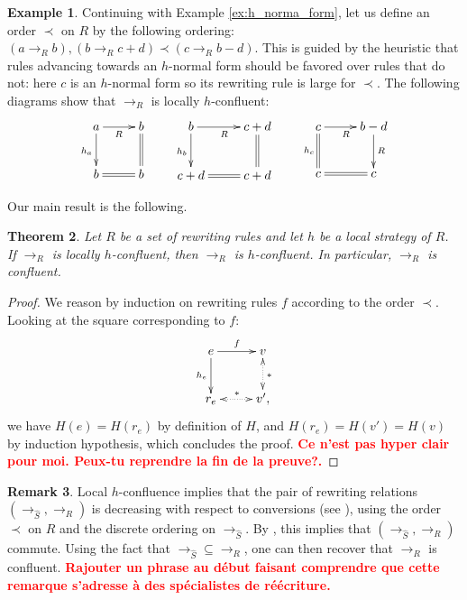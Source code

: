 \documentclass[10pt]{easychair}
\newtheorem{theorem}{Theorem}[section]
\theoremstyle{definition}
\newtheorem{remark}[theorem]{Remark}
\newtheorem{example}[theorem]{Example}
\newcommand\todo[1]{{\bf\textcolor{red}{#1.}}}
\newcommand\rewR{\to_R}
\newcommand\rewS{\to_{\hat{S}}}
\begin{document}
\begin{example}
  Continuing with Example \ref{ex:h_norma_form}, let us define an order
  $\prec$ on $R$ by the following ordering: $(a\rewR b), (b\rewR c+d)
  \prec (c\rewR b-d)$. This is guided by the heuristic that rules
  advancing towards an $h$-normal form should be favored over rules that
  do not: here $c$ is an $h$-normal form so its rewriting rule is large
  for $\prec$. The following diagrams show that $\rewR$ is locally
  $h$-confluent:
  \[
  \xymatrix @C = 2.5em @R = 2.5em{
    a \ar [r] _{R}  
    \ar [d] _{h_a}   
    & b 
    \ar@{=} [d]
    \\
    b
    \ar@{=} [r]
    & b
  }
  \qquad
  \xymatrix @C = 2.5em @R = 2.5em{
    b \ar [r] _{R}  
    \ar [d] _{h_b}   
    & c+d
    \ar@{=} [d]
    \\
    c+d
    \ar@{=} [r]
    & c+d
  }
  \qquad
  \xymatrix @C = 2.5em @R = 2.5em{
    c \ar [r] _{R}  
    \ar@{=} [d] _{h_c}   
    & b-d
    \ar [d] ^{R}
    \\
    c
    \ar@{=} [r]
    & c
  }
  \]
\end{example}
\medskip

Our main result is the following.
\smallskip

\begin{theorem}\label{thm:confluence_criterion}
  Let $R$ be a set of rewriting rules and let $h$ be a local strategy of
  $R$. If $\rewR$ is locally $h$-confluent, then $\rewR$ is
  $h$-confluent. In particular, $\rewR$ is confluent. 
\end{theorem}
\smallskip

\begin{proof}
  We reason by induction on rewriting rules $f$ according to the order
  $\prec$. Looking at the square corresponding to $f$:
  \[
  \xymatrix @C = 2.5em @R = 2.5em{
    e 
    \ar [r] ^{f}
    \ar[d] _{h_e}
    &
    v
    \ar@{<.>} [d] ^{*}
    \\
    r_e
    \ar@{<.>} [r] ^{*}
    & 
    v',
  }
  \]
  we have $H(e)=H(r_e)$ by definition of $H$, and $H(r_e)=H(v')=H(v)$ by
  induction hypothesis, which concludes the proof.
  \todo{Ce n'est pas hyper clair pour moi. Peux-tu reprendre la fin de la
    preuve?}
\end{proof}
\medskip

\begin{remark}
  Local $h$-confluence implies that the pair of rewriting relations
  $(\rewS,\rewR)$ is decreasing with respect to conversions (see
  \cite[Definition 3]{van2008confluence}), using the order $\prec$ on $R$
  and the discrete ordering on $\rewS$. By
  \cite[Theorem 3]{van2008confluence}, this implies that $(\rewS,\rewR)$
  commute. Using the fact that $\rewS \subseteq \rewR$, one can then
  recover that $\rewR$ is confluent.
  \todo{Rajouter un phrase au début faisant comprendre que cette remarque
    s'adresse à des spécialistes de réécriture}
\end{remark}
\medskip
\end{document}
